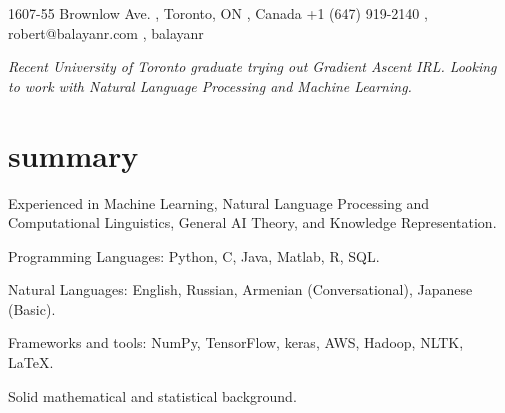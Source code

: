 \documentclass[]{cv-roald}
\begin{document}
\pagestyle{empty} %

{\faMapMarker \hspace{\FAspace} 1607-55 Brownlow Ave. \sep
Toronto, ON \sep
Canada}
{\faMobile \hspace{\FAspace} +1 (647) 919-2140 \sep
\href{mailto:robert@balayanr.com}{\faEnvelope} \hspace{\FAspace} \faSkype\hspace{\FAspace} robert@balayanr.com \sep
\href{https://www.linkedin.com/in/balayanr/}{\faLinkedinSquare} \hspace{\FAspace} \href{https://github.com/balayanr}{\faGithub} \hspace{\FAspace} \href{https://www.facebook.com/balayanr}{\faFacebookSquare} \hspace{\FAspace} balayanr %
}

\hypersetup{
    urlcolor=blue,
}

\textit{Recent University of Toronto graduate trying out Gradient Ascent IRL. Looking to work with Natural Language Processing and Machine Learning.}

\section*{summary}
\begin{tabitemize}
    \item Experienced in Machine Learning, Natural Language Processing and Computational Linguistics, General AI Theory, and Knowledge Representation.
    \item Programming Languages: Python, C, Java, Matlab, R, SQL.
    \item Natural Languages: English, Russian, Armenian (Conversational), Japanese (Basic).
    \item Frameworks and tools: NumPy, TensorFlow, keras, AWS, Hadoop, NLTK, \LaTeX.
    \item Solid mathematical and statistical background.
\end{tabitemize}
\end{document}

